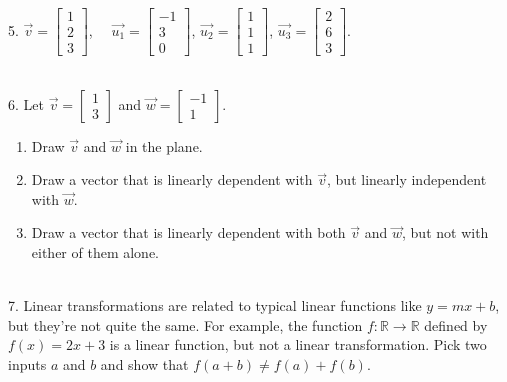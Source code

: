 \documentclass{article}
\begin{document}
5. $\vec{v} = \left[\begin{array}{c} 1 \\ 2 \\ 3 \end{array}\right]$, $\quad \vec{u_1} = \left[\begin{array}{c} -1 \\ 3 \\ 0 \end{array}\right]$, $\vec{u_2} = \left[\begin{array}{c} 1 \\ 1 \\ 1 \end{array}\right]$, $\vec{u_3} = \left[\begin{array}{c} 2 \\ 6 \\ 3 \end{array}\right]$.

~\\

6. Let $\displaystyle \vec{v} = \left[\begin{array}{c} 1 \\ 3 \end{array}\right]$ and $\displaystyle \vec{w} = \left[\begin{array}{c} -1 \\ 1 \end{array}\right]$.

\begin{enumerate}

	\item Draw $\vec{v}$ and $\vec{w}$ in the plane.

	\item Draw a vector that is linearly dependent with $\vec{v}$, but linearly independent with $\vec{w}$.

	\item Draw a vector that is linearly dependent with both $\vec{v}$ and $\vec{w}$, but not with either of them alone.

\end{enumerate}

~\\

7. Linear transformations are related to typical linear functions like $y = mx + b$, but they're not quite the same. For example, the function $f : \mathbb{R} \to \mathbb{R}$ defined by $f(x) = 2x + 3$ is a linear function, but not a linear transformation. Pick two inputs $a$ and $b$ and show that $f(a + b) \neq f(a) + f(b)$.
\end{document}
